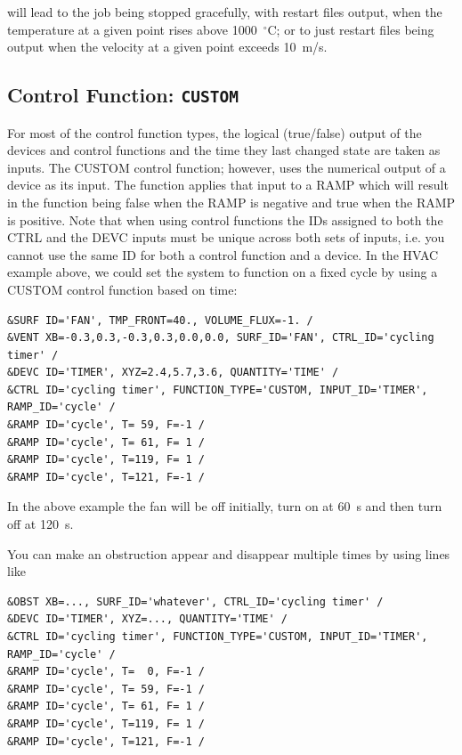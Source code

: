 \documentclass[11pt]{book}
\begin{document}
\noindent
will lead to the job being stopped gracefully, with restart files output, when the temperature at a given point rises above
1000~$^\circ$C; or to just restart files being output when the velocity at a given point exceeds 10~m/s.



\subsection{Control Function: \texorpdfstring{{\tt CUSTOM}}{CUSTOM} }

For most of the
control function types, the logical (true/false) output of the devices and control functions and the time they last changed
state are taken as inputs.  The {\ct CUSTOM} control function; however, uses the numerical output of a
device as its input.  The function applies that input to a {\ct RAMP} which will result in the function being false when
the {\ct RAMP} is negative and true when the {\ct RAMP} is positive. Note that when using control functions the {\ct ID}s assigned to both the
{\ct CTRL} and the {\ct DEVC} inputs must be unique across both sets of inputs, i.e. you cannot use the
same {\ct ID} for both a control function and a device.  In the HVAC example above, we could set the system to function
on a fixed cycle by using a {\ct CUSTOM} control function based on time:

\footnotesize
\begin{verbatim}
&SURF ID='FAN', TMP_FRONT=40., VOLUME_FLUX=-1. /
&VENT XB=-0.3,0.3,-0.3,0.3,0.0,0.0, SURF_ID='FAN', CTRL_ID='cycling timer' /
&DEVC ID='TIMER', XYZ=2.4,5.7,3.6, QUANTITY='TIME' /
&CTRL ID='cycling timer', FUNCTION_TYPE='CUSTOM, INPUT_ID='TIMER', RAMP_ID='cycle' /
&RAMP ID='cycle', T= 59, F=-1 /
&RAMP ID='cycle', T= 61, F= 1 /
&RAMP ID='cycle', T=119, F= 1 /
&RAMP ID='cycle', T=121, F=-1 /
\end{verbatim} \normalsize

\noindent
In the above example the fan will be off initially, turn on at 60~s and then turn off at 120~s.

You can make an obstruction appear and disappear multiple times by using lines like

\footnotesize
\begin{verbatim}
&OBST XB=..., SURF_ID='whatever', CTRL_ID='cycling timer' /
&DEVC ID='TIMER', XYZ=..., QUANTITY='TIME' /
&CTRL ID='cycling timer', FUNCTION_TYPE='CUSTOM, INPUT_ID='TIMER', RAMP_ID='cycle' /
&RAMP ID='cycle', T=  0, F=-1 /
&RAMP ID='cycle', T= 59, F=-1 /
&RAMP ID='cycle', T= 61, F= 1 /
&RAMP ID='cycle', T=119, F= 1 /
&RAMP ID='cycle', T=121, F=-1 /
\end{verbatim}
\end{document}
